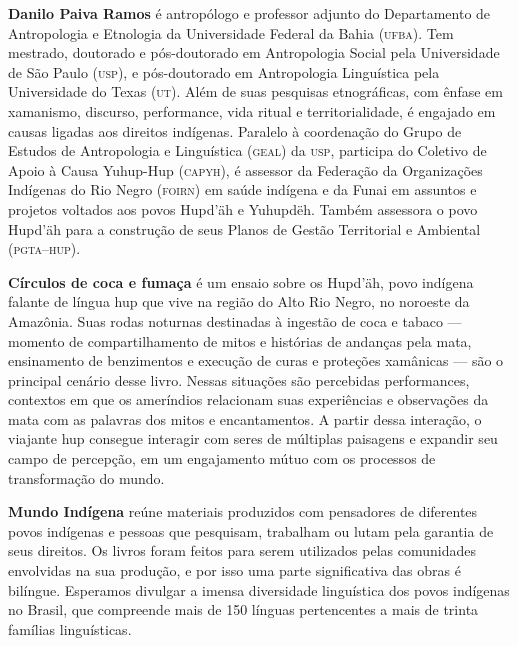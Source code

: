 \textbf{Danilo Paiva Ramos} é antropólogo e professor adjunto do Departamento de Antropologia e Etnologia da Universidade Federal da Bahia \textsc{(ufba)}. Tem mestrado, doutorado e pós-doutorado em Antropologia Social pela Universidade de São Paulo \textsc{(usp)}, e pós-doutorado em Antropologia Linguística pela Universidade do Texas \textsc{(ut)}. Além de suas pesquisas etnográficas, com ênfase em xamanismo, discurso, performance, vida ritual e territorialidade, é engajado em causas ligadas aos direitos indígenas. Paralelo à coordenação do Grupo de Estudos de Antropologia e Linguística (\textsc{geal}) da \textsc{usp}, participa do Coletivo de Apoio à Causa Yuhup-Hup (\textsc{capyh}), é assessor da Federação da Organizações Indígenas do Rio Negro (\textsc{foirn}) em saúde indígena e da Funai em assuntos e projetos voltados aos povos Hupd'äh e Yuhupdëh. Também assessora o povo Hupd'äh para a construção de seus Planos de Gestão Territorial e Ambiental (\textsc{pgta--hup}).

\textbf{Círculos de coca e fumaça} é um ensaio sobre os Hupd’äh, povo indígena falante de língua hup que vive na região do Alto Rio Negro, no noroeste da Amazônia. Suas rodas noturnas destinadas à ingestão de coca e tabaco --- momento de compartilhamento de mitos e histórias de andanças pela mata, ensinamento de benzimentos e execução de curas e proteções xamânicas --- são o principal cenário desse livro. Nessas situações são percebidas performances, contextos em que os ameríndios relacionam suas experiências e observações da mata com as palavras dos mitos e encantamentos. A partir dessa interação, o viajante hup consegue interagir com seres de múltiplas paisagens e expandir seu campo de percepção, em um engajamento mútuo com os processos de transformação do mundo.

\textbf{Mundo Indígena} reúne materiais produzidos com pensadores de diferentes povos indígenas e pessoas que pesquisam, trabalham ou lutam pela garantia de seus direitos. Os livros foram feitos para serem utilizados pelas comunidades envolvidas na sua produção, e por isso uma parte significativa das obras é bilíngue. Esperamos divulgar a imensa diversidade linguística dos povos indígenas no Brasil, que compreende mais de 150 línguas pertencentes a mais de trinta famílias linguísticas.

